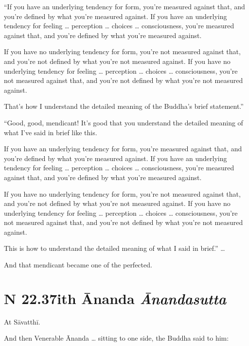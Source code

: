 \documentclass[12pt,openany]{book}%
\newcommand*{\suttatitleacronym}[1]{\smaller[2]{#1}\vspace*{.3em}}
\newcommand*{\suttatitletranslation}[1]{\linebreak{#1}}
\newcommand*{\suttatitleroot}[1]{\linebreak\smaller[2]\itshape{#1}}
\newcommand*{\tocacronym}[1]{\hspace*{-3.3em}{#1}\quad}
\newcommand*{\toctranslation}[1]{#1}
\newcommand*{\tocroot}[1]{(\textit{#1})}
\begin{document}
“If you have an underlying tendency for form, you’re measured against that, and you’re defined by what you’re measured against. If you have an underlying tendency for feeling … perception … choices … consciousness, you’re measured against that, and you’re defined by what you’re measured against. 

If you have no underlying tendency for form, you’re not measured against that, and you’re not defined by what you’re not measured against. If you have no underlying tendency for feeling … perception … choices … consciousness, you’re not measured against that, and you’re not defined by what you’re not measured against. 

That’s how I understand the detailed meaning of the Buddha’s brief statement.” 

“Good, good, mendicant! It’s good that you understand the detailed meaning of what I’ve said in brief like this. 

If you have an underlying tendency for form, you’re measured against that, and you’re defined by what you’re measured against. If you have an underlying tendency for feeling … perception … choices … consciousness, you’re measured against that, and you’re defined by what you’re measured against. 

If you have no underlying tendency for form, you’re not measured against that, and you’re not defined by what you’re not measured against. If you have no underlying tendency for feeling … perception … choices … consciousness, you’re not measured against that, and you’re not defined by what you’re not measured against. 

This is how to understand the detailed meaning of what I said in brief.” … 

And that mendicant became one of the perfected. 

%
\section*{{\suttatitleacronym SN 22.37}{\suttatitletranslation With Ānanda }{\suttatitleroot Ānandasutta}}
\addcontentsline{toc}{section}{\tocacronym{SN 22.37} \toctranslation{With Ānanda } \tocroot{Ānandasutta}}

At \textsanskrit{Sāvatthī}. 

And then Venerable Ānanda … sitting to one side, the Buddha said to him: 
\end{document}
